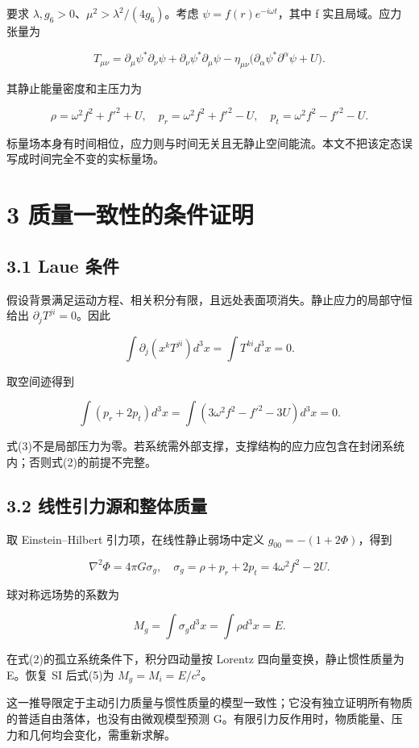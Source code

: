 \documentclass[UTF8,fontset=fandol,11pt]{ctexart}
\begin{document}
要求 \(\lambda,g_6>0\)、\(\mu^2>\lambda^2/(4g_6)\)。考虑 \(\psi=f(r)e^{-i\omega t}\)，其中 f 实且局域。应力张量为

\[
T_{\mu\nu}=\partial_\mu\psi^*\partial_\nu\psi
+\partial_\nu\psi^*\partial_\mu\psi
-\eta_{\mu\nu}\big(\partial_\alpha\psi^*\partial^\alpha\psi+U\big).
\]

其静止能量密度和主压力为

\[
\rho=\omega^2f^2+f'^2+U,
\quad p_r=\omega^2f^2+f'^2-U,
\quad p_t=\omega^2f^2-f'^2-U.
\tag{1}
\]

标量场本身有时间相位，应力则与时间无关且无静止空间能流。本文不把该定态误写成时间完全不变的实标量场。

\section*{3 质量一致性的条件证明}

\subsection*{3.1 Laue 条件}

假设背景满足运动方程、相关积分有限，且远处表面项消失。静止应力的局部守恒给出 \(\partial_jT^{ji}=0\)。因此

\[
\int\partial_j(x^kT^{ji})d^3x=\int T^{ki}d^3x=0.
\tag{2}
\]

取空间迹得到

\[
\int(p_r+2p_t)d^3x
=\int(3\omega^2f^2-f'^2-3U)d^3x=0.
\tag{3}
\]

式(3)不是局部压力为零。若系统需外部支撑，支撑结构的应力应包含在封闭系统内；否则式(2)的前提不完整。

\subsection*{3.2 线性引力源和整体质量}

取 Einstein–Hilbert 引力项，在线性静止弱场中定义 \(g_{00}=-(1+2\Phi)\)，得到

\[
\nabla^2\Phi=4\pi G\sigma_g,
\quad\sigma_g=\rho+p_r+2p_t=4\omega^2f^2-2U.
\tag{4}
\]

球对称远场势的系数为

\[
M_g=\int\sigma_gd^3x=\int\rho d^3x=E.
\tag{5}
\]

在式(2)的孤立系统条件下，积分四动量按 Lorentz 四向量变换，静止惯性质量为 E。恢复 SI 后式(5)为 \(M_g=M_i=E/c^2\)。

这一推导限定于主动引力质量与惯性质量的模型一致性；它没有独立证明所有物质的普适自由落体，也没有由微观模型预测 G。有限引力反作用时，物质能量、压力和几何均会变化，需重新求解。
\end{document}
